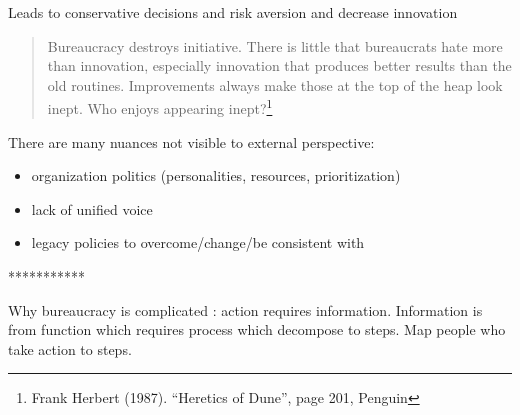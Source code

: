 Leads to conservative decisions and risk aversion and decrease innovation

\begin{quote}
Bureaucracy destroys initiative. There is little that bureaucrats hate more than innovation, especially innovation that produces better results than the old routines. Improvements always make those at the top of the heap look inept. Who enjoys appearing inept?\footnote{Frank Herbert (1987). ``Heretics of Dune'', page 201, Penguin}
\end{quote}

There are many nuances not visible to external perspective:
\begin{itemize}
    \item organization politics (personalities, resources, prioritization)
\item lack of unified voice
\item legacy policies to overcome/change/be consistent with
\end{itemize}

***********

Why bureaucracy is complicated : action requires information. Information is from function which requires process which decompose to steps. Map people who take action to steps.

